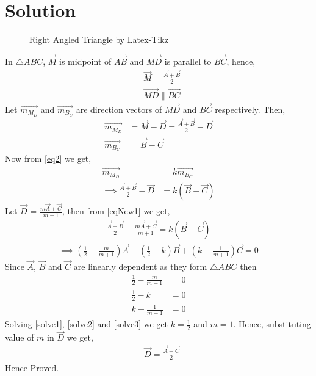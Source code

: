 \documentclass[journal,12pt,twocolumn]{IEEEtran}
\begin{document}
\section{Solution}
\renewcommand{\thefigure}{1}
\begin{figure}[!h]
\centering
{}
\caption{Right Angled Triangle by Latex-Tikz}
\label{myfig}
\end{figure}
In $\triangle{ABC}$, $\vec{M}$ is midpoint of $\vec{AB}$ and $\vec{MD}$ is parallel to $\vec{BC}$, hence,
\begin{align}
&\vec{M} = \frac{\vec{A}+\vec{B}}{2}\label{eq1}\\
&\vec{MD} \parallel \vec{BC}\label{eq2}
\end{align}
Let $\vec{m_M_D}$ and $\vec{m_B_C}$ are direction vectors of $\vec{MD}$ and $\vec{BC}$ respectively. Then,
\begin{align}
\vec{m_M_D} &= \vec{M} - \vec{D} = \frac{\vec{A}+\vec{B}}{2} - \vec{D}\\
\vec{m_B_C} &= \vec{B} - \vec{C}
\end{align}
Now from \eqref{eq2} we get,
\begin{align}
\vec{m_M_D} &= k\vec{m_B_C}\\
\implies\frac{\vec{A}+\vec{B}}{2} - \vec{D} &= k(\vec{B} - \vec{C})\label{eqNew1}
\end{align}
Let $\vec{D}$ = $\frac{m\vec{A}+\vec{C}}{m+1}$, then from \eqref{eqNew1} we get,
\begin{align}
\frac{\vec{A}+\vec{B}}{2} - \frac{m\vec{A}+\vec{C}}{m+1} = k(\vec{B} - \vec{C})
\end{align}
\begin{align}
\implies(\frac{1}{2}-\frac{m}{m+1})\vec{A}+(\frac{1}{2}-k)\vec{B}+(k-\frac{1}{m+1})\vec{C} =0
\end{align}
Since $\vec{A}$, $\vec{B}$ and $\vec{C}$ are linearly dependent as they form $\triangle{ABC}$ then 
\begin{align}
\frac{1}{2}-\frac{m}{m+1} &= 0\label{solve1}\\
\frac{1}{2}-k & = 0\label{solve2}\\
k-\frac{1}{m+1} &= 0\label{solve3}
\end{align}
Solving \eqref{solve1}, \eqref{solve2} and \eqref{solve3} we get $k=\frac{1}{2}$ and $m = 1$. Hence, substituting value of $m$ in $\vec{D}$ we get,
\begin{align}
&\vec{D} = \frac{\vec{A}+\vec{C}}{2}\label{eq3}
\end{align}
Hence Proved.\\
\end{document}
